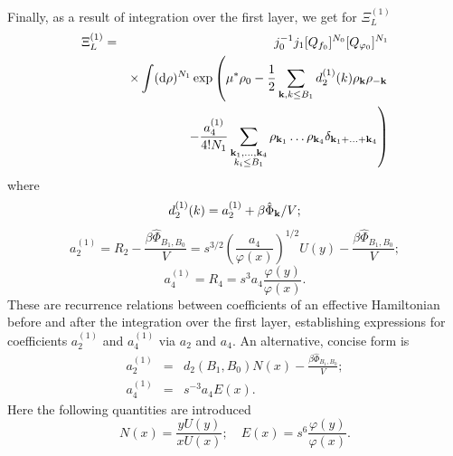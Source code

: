 Finally, as a result of integration over the first layer, we get for $\Xi_L^{(1)}$
\begin{eqnarray}
	\Xi_L^{(1)} & = & j_0^{-1}j_1 [Q_{f_0}]^{N_0} [Q_{\varphi_0}]^{N_1} 
	\\
	&& \times 
	\int ({\rm d} \rho)^{N_1} \exp
	\left(
		\mu^*\rho_0 - \frac{1}{2} \sum_{\vb k, k \leq B_1} d_2^{(1)}(k) \rho_{\vb k} \rho_{-\vb k}
	\right.
	\nonumber \\
	&& 
	\left.
		- \frac{a_4^{(1)}}{4!N_1} \sum_{\substack{\vb k_1, \dotsc, \vb k_4 \\ k_i \leq B_1}}
		\rho_{\vb k_1} \dotsc \rho_{\vb k_4} \delta_{\vb{k}_1 + \dotsc + \vb{k}_4}
	\right)
	\nonumber
\end{eqnarray}
where
\begin{equation}
	\label{RR_1_0_d}
	d_2^{(1)}(k) = a_2^{(1)} + \beta\hat{\Phi}_{\vb k} / V;
\end{equation}
\begin{equation}
	\label{RR_1_0_a2}
	a_2^{(1)} = R_2 - \frac{\beta\hat{\Phi}_{B_1, B_0}}{V} = s^{3/2} \left(\frac{a_4}{\varphi(x)}\right)^{1/2} U(y)
	- \frac{\beta\hat{\Phi}_{B_1, B_0}}{V};
\end{equation}
\begin{equation}
	\label{RR_1_0_a4}
	a_4^{(1)} = R_4 = s^3 a_4 \frac{\varphi(y)}{\varphi(x)}.
\end{equation}
These are recurrence relations between coefficients of an effective Hamiltonian before and after the integration over the first layer, establishing expressions for coefficients $a_2^{(1)}$ and $a_4^{(1)}$ via $a_2$ and $a_4$. An alternative, concise form is
\begin{eqnarray}
	\label{RR_1_0_a2_short}
	a_2^{(1)} & = & d_2(B_1, B_0) N(x) - \frac{\beta\hat{\Phi}_{B_1, B_0}}{V};
	\\
	\label{RR_1_0_a4_short}
	a_4^{(1)} & = & s^{-3} a_4 E(x).
\end{eqnarray}
Here the following quantities are introduced
\begin{equation*}
	N(x) = \frac{y U(y)}{x U(x)}; \quad E(x) = s^6 \frac{\varphi(y)}{\varphi(x)}.
\end{equation*}

